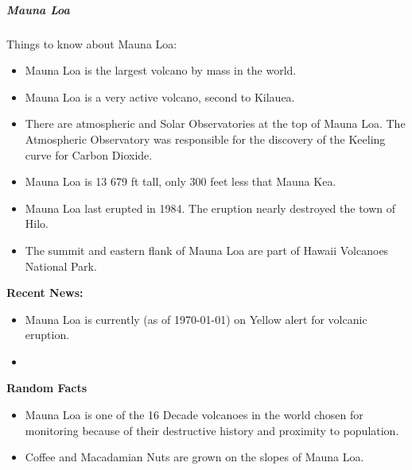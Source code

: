 					\newpage
					\subparagraph{Mauna Loa}
						Things to know about Mauna Loa:
						\begin{itemize}
							\item Mauna Loa is the largest volcano by mass in the world.  
							\item Mauna Loa is a very active volcano, second to Kilauea.
							\item There are atmospheric and Solar Observatories at the top of Mauna Loa.  The Atmospheric Observatory was responsible for the discovery of the Keeling curve for Carbon Dioxide.
							\item Mauna Loa is 13 679 ft tall, only 300 feet less that Mauna Kea.
							\item Mauna Loa last erupted in 1984.  The eruption nearly destroyed the town of Hilo.
							\item The summit and eastern flank of Mauna Loa are part of Hawaii Volcanoes National Park.  
						\end{itemize}
						
						\textbf{Recent News:} 
						\begin{itemize}
							\item Mauna Loa is currently (as of \today) on Yellow alert for volcanic eruption.
							\item 
						\end{itemize}
						
						\textbf{Random Facts}
						\begin{itemize}
							\item Mauna Loa is one of the 16 Decade volcanoes in the world chosen for monitoring because of their destructive history and proximity to population. 
							\item Coffee and Macadamian Nuts are grown on the slopes of Mauna Loa.
							
						\end{itemize}					
					
